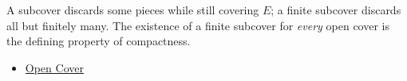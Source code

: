\begin{remark*}[Interpretation]
A subcover discards some pieces while still covering $E$; a finite subcover discards all but finitely many. The existence of a finite subcover for \emph{every} open cover is the defining property of compactness.
\end{remark*}
\begin{dependencies}
\begin{itemize}
  \item \hyperref[def:real-open-cover]{Open Cover}
\end{itemize}
\end{dependencies}
